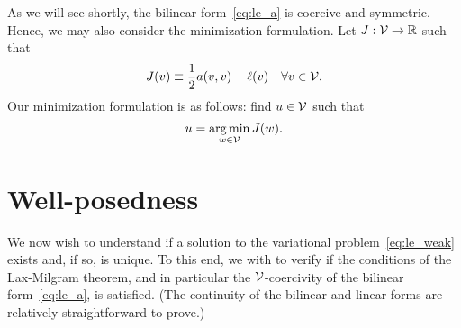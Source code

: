 As we will see shortly, the bilinear form~\eqref{eq:le_a} is coercive and symmetric.  Hence, we may also consider the minimization formulation.  Let $J : \mathcal{V} \to \mathbb{R}$ such that
\begin{equation}
  J(v) \equiv \frac{1}{2} a(v,v) - \ell(v) \quad \forall v \in \mathcal{V}.
  \label{eq:le_J}
\end{equation}
Our minimization formulation is as follows: find $u \in \mathcal{V}$ such that
\begin{equation*}
  u = \operatorname*{arg\,min}_{w \in \mathcal{V}} J(w).
\end{equation*}



\section{Well-posedness}
\label{sec:le_wellposed}
We now wish to understand if a solution to the variational problem~\eqref{eq:le_weak} exists and, if so, is unique.  To this end, we with to verify if the conditions of the Lax-Milgram theorem, and in particular the $\mathcal{V}$-coercivity of the bilinear form~\eqref{eq:le_a}, is satisfied.  (The continuity of the bilinear and linear forms are relatively straightforward to prove.)

